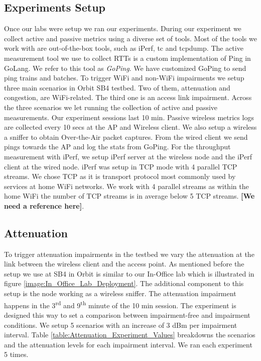 \subsection{Experiments Setup}\label{Experiments_setup}

Once our labs were setup we ran our experiments. During our experiment we collect active and passive metrics using a diverse set of tools. Most of the tools we work with are out-of-the-box tools, such as iPerf, tc and tcpdump. The active measurement tool we use to collect RTTs is a custom implementation of Ping in GoLang. We refer to this tool as \emph{GoPing}. We have customized GoPing to send ping trains and batches.
To trigger WiFi and non-WiFi impairments we setup three main scenarios in Orbit SB4 testbed. Two of them, attenuation and congestion, are WiFi-related. The third one is an access link impairment. Across the three scenarios we let running the collection of active and passive measurements. Our experiment sessions last 10 min. Passive wireless metrics logs are collected every 10 secs at the AP and Wireless client. We also setup a wireless a sniffer to obtain Over-the-Air packet captures. From the wired client we send pings towards the AP and log the stats from GoPing. For the throughput measurement with iPerf, we setup iPerf server at the wireless node and the iPerf client at the wired node. iPerf was setup in TCP mode with 4 parallel TCP streams. We chose TCP as it is transport protocol most commonly used by services at home WiFi networks. We work with 4 parallel streams as within the home WiFi the number of TCP streams is in average below 5 TCP streams. \textbf{[We need a reference here]}.

\subsection*{Attenuation}\label{attenuation}

To trigger attenuation impairments in the testbed we vary the attenuation at the link between the wireless client and the access point. As mentioned before the setup we use at SB4 in Orbit is similar to our In-Office lab which is illustrated in figure \ref{image:In_Office_Lab_Deployment}. The additional component to this setup is the node working as a wireless sniffer. The attenuation impairment happens in the 3\textsuperscript{rd} and 9\textsuperscript{th} minute of the 10 min session. The experiment is designed this way to set a comparison between impairment-free and impairment conditions. We setup 5 scenarios with an increase of 3 dBm per impairment interval. Table \ref{table:Attenuation_Experiment_Values} breakdowns the scenarios and the attenuation levels for each impairment interval. We ran each experiment 5 times.

